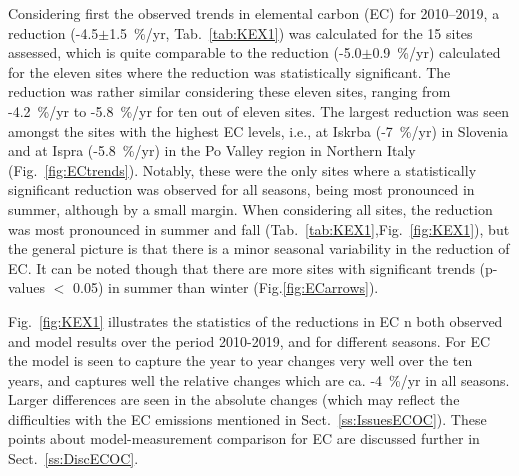 %
Considering first the observed trends in elemental carbon (EC) for 2010--2019, a  reduction (-4.5$\pm$1.5~\%/yr, Tab.~\ref{tab:KEX1}) 
 was
calculated for the 15 sites assessed, which is
quite comparable to the reduction (-5.0$\pm$0.9~\%/yr)
calculated for the eleven sites where the reduction was statistically
significant. The reduction was rather similar considering these eleven
sites, ranging from -4.2~\%/yr to -5.8~\%/yr for ten out of eleven
sites. %
The largest reduction was seen amongst the sites with the
highest EC levels, i.e., at Iskrba (-7~\%/yr) in Slovenia and at Ispra
(-5.8~\%/yr) in the Po Valley region in Northern Italy (Fig.~\ref{fig:ECtrends}). Notably, these
were the only sites where a statistically significant reduction was
observed for all seasons, being most pronounced in summer, although
by a small margin. When considering all sites, the reduction was most
pronounced in summer and fall (Tab.~\ref{tab:KEX1},Fig.~\ref{fig:KEX1}), but the general picture is
that there is a minor seasonal variability in the reduction of EC. It can be noted though that
there are more sites with significant trends (p-values $<$ 0.05)  in summer than winter (Fig.\ref{fig:ECarrows}).

Fig.~\ref{fig:KEX1} illustrates the statistics of the reductions in EC  n both observed and model results over the period 2010-2019, and for different seasons. For EC the model is seen to capture the year to year changes very well over the ten years, and captures well the relative changes which are ca. -4~\%/yr in all seasons. Larger differences are seen in the absolute changes (which may reflect the difficulties with the EC emissions mentioned in Sect.~\ref{ss:IssuesECOC}).
These points about model-measurement comparison for EC are discussed further in Sect.~\ref{ss:DiscECOC}.

